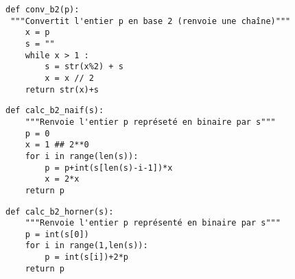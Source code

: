 \setcounter{numques}{0}


\begin{lstlisting}
def conv_b2(p):
 """Convertit l'entier p en base 2 (renvoie une chaîne)"""
    x = p
    s = ""
    while x > 1 :
        s = str(x%2) + s
        x = x // 2
    return str(x)+s
\end{lstlisting}    


\begin{lstlisting}
def calc_b2_naif(s):
    """Renvoie l'entier p représeté en binaire par s"""
    p = 0
    x = 1 ## 2**0
    for i in range(len(s)):
        p = p+int(s[len(s)-i-1])*x
        x = 2*x
    return p
\end{lstlisting}


\begin{lstlisting}
def calc_b2_horner(s):
    """Renvoie l'entier p représenté en binaire par s"""
    p = int(s[0])
    for i in range(1,len(s)):
        p = int(s[i])+2*p
    return p
\end{lstlisting}